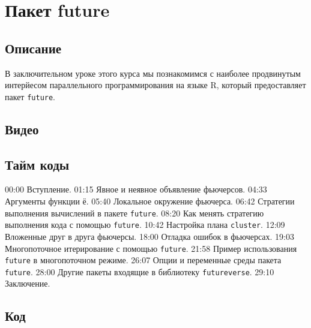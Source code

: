 \documentclass[
]{book}
\begin{document}
\hypertarget{ux43fux430ux43aux435ux442-future}{%
\chapter{Пакет future}\label{ux43fux430ux43aux435ux442-future}}

\hypertarget{ux43eux43fux438ux441ux430ux43dux438ux435-6}{%
\section{Описание}\label{ux43eux43fux438ux441ux430ux43dux438ux435-6}}

В заключительном уроке этого курса мы познакомимся с наиболее продвинутым интерйесом параллельного программирования на языке R, который предоставляет пакет \texttt{future}.

\hypertarget{ux432ux438ux434ux435ux43e-6}{%
\section{Видео}\label{ux432ux438ux434ux435ux43e-6}}

\hypertarget{ux442ux430ux439ux43c-ux43aux43eux434ux44b-6}{%
\section{Тайм коды}\label{ux442ux430ux439ux43c-ux43aux43eux434ux44b-6}}

00:00 Вступление.
01:15 Явное и неявное объявление фьючерсов.
04:33 Аргументы функции ё.
05:40 Локальное окружение фьючерса.
06:42 Стратегии выполнения вычислений в пакете \texttt{future}.
08:20 Как менять стратегию выполнения кода с помощью \texttt{future}.
10:42 Настройка плана \texttt{cluster}.
12:09 Вложенные друг в друга фьючерсы.
18:00 Отладка ошибок в фьючерсах.
19:03 Многопоточное итерирование с помощью \texttt{future}.
21:58 Пример использования \texttt{future} в многопоточном режиме.
26:07 Опции и переменные среды пакета \texttt{future}.
28:00 Другие пакеты входящие в библиотеку \texttt{futureverse}.
29:10 Заключение.

\hypertarget{ux43aux43eux434-6}{%
\section{Код}\label{ux43aux43eux434-6}}
\end{document}
